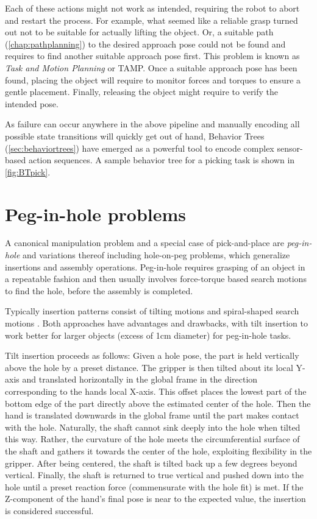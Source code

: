 Each of these actions might not work as intended, requiring the robot to abort and restart the process. For example, what seemed like a reliable grasp turned out not to be suitable for actually lifting the object. Or, a suitable path (\cref{chap:pathplanning}) to the desired approach pose could not be found and requires to find another suitable approach pose first. This problem is known as \emph{Task and Motion Planning} or TAMP. Once a suitable approach pose has been found, placing the object will require to monitor forces and torques to ensure a gentle placement. Finally, releasing the object might require to verify the intended pose. 

As failure can occur anywhere in the above pipeline and manually encoding all possible state transitions will quickly get out of hand,  Behavior Trees (\cref{sec:behaviortrees}) have emerged as a powerful tool to encode complex sensor-based action sequences. A sample behavior tree for a picking task is shown in \cref{fig:BTpick}.

\section{Peg-in-hole problems}\label{sec:peginhole}
A canonical manipulation problem and a special case of pick-and-place are \textsl{peg-in-hole} and variations thereof including hole-on-peg problems, which generalize insertions and assembly operations. Peg-in-hole requires grasping of an object in a repeatable fashion and then usually involves force-torque based search motions to find the hole, before the assembly is completed. 

Typically insertion patterns consist of tilting motions and spiral-shaped search motions \cite{watson2020autonomous}. Both approaches have advantages and drawbacks, with tilt insertion to work better for larger objects (excess of 1cm diameter) for peg-in-hole tasks. 

Tilt insertion proceeds as follows: Given a hole pose, the part is held vertically above the hole by a preset distance. The gripper is then tilted about its local Y-axis and translated horizontally in the global frame in the direction corresponding to the hands local X-axis.  This offset places the lowest part of the bottom edge of the part directly above the estimated center of the hole.  Then the hand is translated downwards in the global frame until the part makes contact with the hole.  Naturally, the shaft cannot sink deeply into the hole when tilted this way.  Rather, the curvature of the hole meets the circumferential surface of the shaft and gathers it towards the center of the hole, exploiting flexibility in the gripper.  After being centered, the shaft is tilted back up a few degrees beyond vertical. Finally, the shaft is returned to true vertical and pushed down into the hole until a preset reaction force (commensurate with the hole fit) is met.  If the Z-component of the hand's final pose is near to the expected value, the insertion is considered successful.


